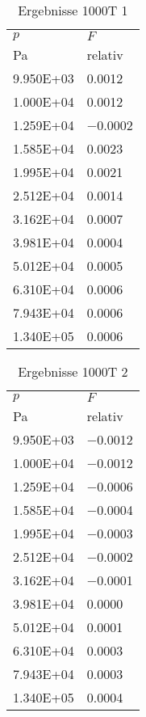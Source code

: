 \begin{table}\begin{tabular}{l l }
\toprule
$p$&$F$\\
 Pa & relativ \\\midrule
\num{9.950E+03}&\num{0.0012}\\
\num{1.000E+04}&\num{0.0012}\\
\num{1.259E+04}&\num{-0.0002}\\
\num{1.585E+04}&\num{0.0023}\\
\num{1.995E+04}&\num{0.0021}\\
\num{2.512E+04}&\num{0.0014}\\
\num{3.162E+04}&\num{0.0007}\\
\num{3.981E+04}&\num{0.0004}\\
\num{5.012E+04}&\num{0.0005}\\
\num{6.310E+04}&\num{0.0006}\\
\num{7.943E+04}&\num{0.0006}\\
\num{1.340E+05}&\num{0.0006}\\
\bottomrule
\end{tabular}\caption{Ergebnisse 1000T 1}\end{table}\begin{table}\begin{tabular}{l l }
\toprule
$p$&$F$\\
 Pa & relativ \\\midrule
\num{9.950E+03}&\num{-0.0012}\\
\num{1.000E+04}&\num{-0.0012}\\
\num{1.259E+04}&\num{-0.0006}\\
\num{1.585E+04}&\num{-0.0004}\\
\num{1.995E+04}&\num{-0.0003}\\
\num{2.512E+04}&\num{-0.0002}\\
\num{3.162E+04}&\num{-0.0001}\\
\num{3.981E+04}&\num{0.0000}\\
\num{5.012E+04}&\num{0.0001}\\
\num{6.310E+04}&\num{0.0003}\\
\num{7.943E+04}&\num{0.0003}\\
\num{1.340E+05}&\num{0.0004}\\
\bottomrule
\end{tabular}\caption{Ergebnisse 1000T 2}\end{table}\begin{table}\begin{tabular}{l l }
\toprule

\end{tabular}
\end{table}
